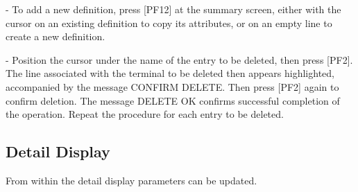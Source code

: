\documentclass[letterpaper,10pt,english]{sphinxmanual}
\begin{document}
 - To add a new definition, press {[}PF12{]} at the summary screen, either with the cursor on an existing definition to copy its attributes, or on an empty line to create a new definition.

 - Position the cursor under the name of the entry to be deleted, then press {[}PF2{]}. The line associated with the terminal to be deleted then appears highlighted, accompanied by the message CONFIRM DELETE. Then press {[}PF2{]} again to confirm deletion. The message DELETE OK confirms successful completion of the operation. Repeat the procedure for each entry to be deleted.


\subsection{Detail Display}
\label{\detokenize{connectivity_guide:id52}}\label{\detokenize{connectivity_guide:index-99}}

From within the detail display parameters can be updated.

\end{document}
